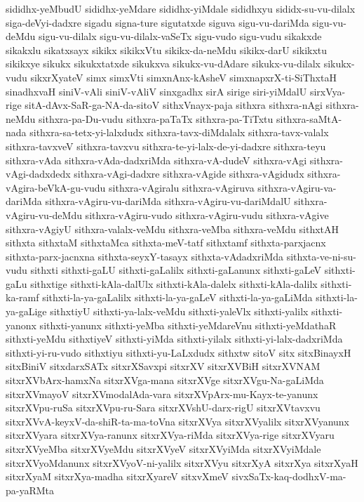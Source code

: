 {sididhx-yeMbudU
sididhx-yeMdare
sididhx-yiMdale
sididhxyu
sididx-su-vu-dilalx
siga-deVyi-dadxre
sigadu
signa-ture
sigutatxde
siguva
sigu-vu-dariMda
sigu-vu-deMdu
sigu-vu-dilalx
sigu-vu-dilalx-vaSeTx
sigu-vudo
sigu-vudu
sikakxde
sikakxlu
sikatxsayx
sikikx
sikikxVtu
sikikx-da-neMdu
sikikx-darU
sikikxtu
sikikxye
sikukx
sikukxtatxde
sikukxva
sikukx-vu-dAdare
sikukx-vu-dilalx
sikukx-vudu
sikxrXyateV
simx
simxVti
simxnAnx-kAsheV
simxnapxrX-ti-SiThxtaH
sinadhxvaH
siniV-vAli
siniV-vAliV
sinxgadhx
sirA
sirige
siri-yiMdalU
sirxVya-rige
sitA-dAvx-SaR-ga-NA-da-sitoV
sithxVnayx-paja
sithxra
sithxra-nAgi
sithxra-neMdu
sithxra-pa-Du-vudu
sithxra-paTaTx
sithxra-pa-TiTxtu
sithxra-saMtA-nada
sithxra-sa-tetx-yi-lalxdudx
sithxra-tavx-diMdalalx
sithxra-tavx-valalx
sithxra-tavxveV
sithxra-tavxvu
sithxra-te-yi-lalx-de-yi-dadxre
sithxra-teyu
sithxra-vAda
sithxra-vAda-dadxriMda
sithxra-vA-dudeV
sithxra-vAgi
sithxra-vAgi-dadxdedx
sithxra-vAgi-dadxre
sithxra-vAgide
sithxra-vAgidudx
sithxra-vAgira-beVkA-gu-vudu
sithxra-vAgiralu
sithxra-vAgiruva
sithxra-vAgiru-va-dariMda
sithxra-vAgiru-vu-dariMda
sithxra-vAgiru-vu-dariMdalU
sithxra-vAgiru-vu-deMdu
sithxra-vAgiru-vudo
sithxra-vAgiru-vudu
sithxra-vAgive
sithxra-vAgiyU
sithxra-valalx-veMdu
sithxra-veMba
sithxra-veMdu
sithxtAH
sithxta
sithxtaM
sithxtaMca
sithxta-meV-tatf
sithxtamf
sithxta-parxjacnx
sithxta-parx-jacnxna
sithxta-seyxY-tasayx
sithxta-vAdadxriMda
sithxta-ve-ni-su-vudu
sithxti
sithxti-gaLU
sithxti-gaLalilx
sithxti-gaLanunx
sithxti-gaLeV
sithxti-gaLu
sithxtige
sithxti-kAla-dalUlx
sithxti-kAla-dalelx
sithxti-kAla-dalilx
sithxti-ka-ramf
sithxti-la-ya-gaLalilx
sithxti-la-ya-gaLeV
sithxti-la-ya-gaLiMda
sithxti-la-ya-gaLige
sithxtiyU
sithxti-ya-lalx-veMdu
sithxti-yaleVlx
sithxti-yalilx
sithxti-yanonx
sithxti-yanunx
sithxti-yeMba
sithxti-yeMdareVnu
sithxti-yeMdathaR
sithxti-yeMdu
sithxtiyeV
sithxti-yiMda
sithxti-yilalx
sithxti-yi-lalx-dadxriMda
sithxti-yi-ru-vudo
sithxtiyu
sithxti-yu-LaLxdudx
sithxtw
sitoV
sitx
sitxBinayxH
sitxBiniV
sitxdarxSATx
sitxrXSavxpi
sitxrXV
sitxrXVBiH
sitxrXVNAM
sitxrXVbArx-hamxNa
sitxrXVga-mana
sitxrXVge
sitxrXVgu-Na-gaLiMda
sitxrXVmayoV
sitxrXVmodalAda-vara
sitxrXVpArx-mu-Kayx-te-yanunx
sitxrXVpu-ruSa
sitxrXVpu-ru-Sara
sitxrXVshU-darx-rigU
sitxrXVtavxvu
sitxrXVvA-keyxV-da-shiR-ta-ma-toVna
sitxrXVya
sitxrXVyalilx
sitxrXVyanunx
sitxrXVyara
sitxrXVya-ranunx
sitxrXVya-riMda
sitxrXVya-rige
sitxrXVyaru
sitxrXVyeMba
sitxrXVyeMdu
sitxrXVyeV
sitxrXVyiMda
sitxrXVyiMdale
sitxrXVyoMdanunx
sitxrXVyoV-ni-yalilx
sitxrXVyu
sitxrXyA
sitxrXya
sitxrXyaH
sitxrXyaM
sitxrXya-madha
sitxrXyareV
sitxvXmeV
sivxSaTx-kaq-dodhxV-ma-pa-yaRMta
}
